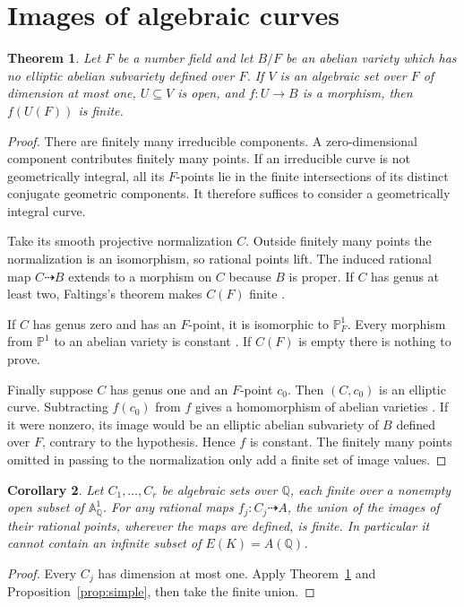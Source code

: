 \documentclass[11pt,a4paper]{article}
\newtheorem{theorem}{Theorem}[section]
\newtheorem{corollary}[theorem]{Corollary}
\theoremstyle{definition}\newtheorem{definition}[theorem]{Definition}
\begin{document}
\section{Images of algebraic curves}

\begin{theorem}\label{thm:curve-images}
Let $F$ be a number field and let $B/F$ be an abelian variety
which has no elliptic abelian subvariety defined over $F$.
If $V$ is an algebraic set over $F$ of dimension at most one,
$U\subseteq V$ is open, and $f:U\to B$ is a morphism, then
$f(U(F))$ is finite.
\end{theorem}
\begin{proof}
There are finitely many irreducible components. A zero-dimensional
component contributes finitely many points. If an irreducible curve
is not geometrically integral, all its $F$-points lie in the finite
intersections of its distinct conjugate geometric components.
It therefore suffices to consider a geometrically integral curve.

Take its smooth projective normalization $C$. Outside finitely many
points the normalization is an isomorphism, so rational points lift.
The induced rational map $C\dashrightarrow B$ extends to a morphism
on $C$ because $B$ is proper. If $C$ has genus at least two,
Faltings's theorem makes $C(F)$ finite \cite{Faltings1983}.

If $C$ has genus zero and has an $F$-point, it is isomorphic to
$\mathbb P^1_F$. Every morphism from $\mathbb P^1$ to an abelian
variety is constant \cite[Chapter I, Proposition 3.9]{MilneAV}.
If $C(F)$ is empty there is nothing to prove.

Finally suppose $C$ has genus one and an $F$-point $c_0$.
Then $(C,c_0)$ is an elliptic curve. Subtracting $f(c_0)$ from
$f$ gives a homomorphism of abelian varieties
\cite[Chapter I, Corollary 1.2]{MilneAV}. If it were nonzero,
its image would be an elliptic abelian subvariety of $B$ defined
over $F$, contrary to the hypothesis. Hence $f$ is constant.
The finitely many points omitted in passing to the normalization
only add a finite set of image values.
\end{proof}

\begin{corollary}\label{cor:one-parameter}
Let $C_1,\ldots,C_r$ be algebraic sets over $\mathbb Q$, each
finite over a nonempty open subset of $\mathbb A^1_{\mathbb Q}$.
For any rational maps $f_j:C_j\dashrightarrow A$, the union
of the images of their rational points, wherever the maps are
defined, is finite. In particular it cannot contain an infinite
subset of $E(K)=A(\mathbb Q)$.
\end{corollary}
\begin{proof}
Every $C_j$ has dimension at most one. Apply
Theorem~\ref{thm:curve-images} and Proposition~\ref{prop:simple},
then take the finite union.
\end{proof}
\end{document}
